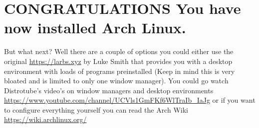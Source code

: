 \documentclass[titlepage]{article}
\begin{document}
\section{CONGRATULATIONS You have now installed Arch Linux.}
  But what next? Well there are a couple of options you could either use the original \url{https://larbs.xyz} by Luke Smith that provides you with a desktop environment with loads of programs preinstalled (Keep in mind this is very bloated and is limited to only one window manager). You could go watch Distrotube's video's on window managers and desktop environments \url{https://www.youtube.com/channel/UCVls1GmFKf6WlTraIb_IaJg}
  or if you want to configure everything yourself you can read the Arch Wiki \url{https://wiki.archlinux.org/}
\end{document}
